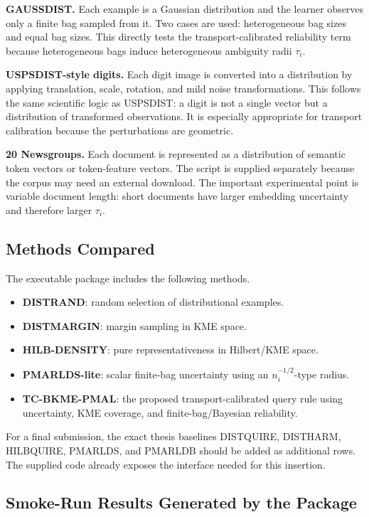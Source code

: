 \documentclass[10pt,journal]{IEEEtran}
\begin{document}
\textbf{GAUSSDIST.} Each example is a Gaussian distribution and the learner observes only a finite bag sampled from it. Two cases are used: heterogeneous bag sizes and equal bag sizes. This directly tests the transport-calibrated reliability term because heterogeneous bags induce heterogeneous ambiguity radii $\tau_i$.

\textbf{USPSDIST-style digits.} Each digit image is converted into a distribution by applying translation, scale, rotation, and mild noise transformations. This follows the same scientific logic as USPSDIST: a digit is not a single vector but a distribution of transformed observations. It is especially appropriate for transport calibration because the perturbations are geometric.

\textbf{20 Newsgroups.} Each document is represented as a distribution of semantic token vectors or token-feature vectors. The script is supplied separately because the corpus may need an external download. The important experimental point is variable document length: short documents have larger embedding uncertainty and therefore larger $\tau_i$.

\subsection{Methods Compared}

The executable package includes the following methods.
\begin{itemize}[leftmargin=1.1em]
\item \textbf{DISTRAND}: random selection of distributional examples.
\item \textbf{DISTMARGIN}: margin sampling in KME space.
\item \textbf{HILB-DENSITY}: pure representativeness in Hilbert/KME space.
\item \textbf{PMARLDS-lite}: scalar finite-bag uncertainty using an $n_i^{-1/2}$-type radius.
\item \textbf{TC-BKME-PMAL}: the proposed transport-calibrated query rule using uncertainty, KME coverage, and finite-bag/Bayesian reliability.
\end{itemize}
For a final submission, the exact thesis baselines DISTQUIRE, DISTHARM, HILBQUIRE, PMARLDS, and PMARLDB should be added as additional rows. The supplied code already exposes the interface needed for this insertion.

\subsection{Smoke-Run Results Generated by the Package}
\end{document}
